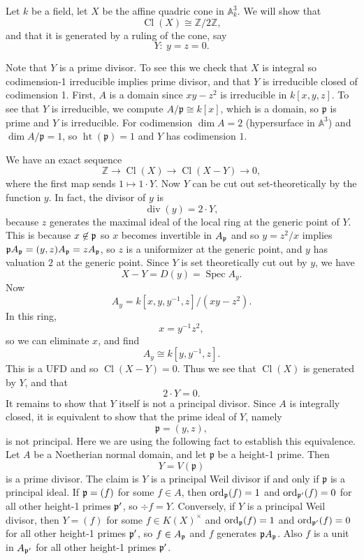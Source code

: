 \documentclass[12pt]{article}
\begin{document}
\begin{example}
    Let \(k\) be a field, let $X$ be the affine quadric cone in \(\mathbb A_k^3\). We will show that
    \[
        \operatorname{Cl}(X)\cong \mathbb Z/2\mathbb Z,
    \]
    and that it is generated by a ruling of the cone, say
    \[
        Y:\ y=z=0.
    \]

    Note that $Y$ is a prime divisor. To see this we check that $X$ is integral so codimension-1 irreducible implies prime divisor, and that $Y$ is irreducible closed of codimension 1. First, $A$ is a domain since $xy-z^2$ is irreducible in $k[x,y,z]$. To see that $Y$ is irreducible, we compute $A/\mathfrak{p} \cong k[x]$, which is a domain, so $\mathfrak{p}$ is prime and $Y$ is irreducible. For codimension $\dim A = 2$ (hypersurface in $\mathbb{A}^3$) and $\dim A/\mathfrak{p} = 1$, so $\operatorname{ht}(\mathfrak{p})=1$ and $Y$ has codimension $1$.

    We have an exact sequence
    \[
        \mathbb Z \longrightarrow \operatorname{Cl}(X)\longrightarrow \operatorname{Cl}(X-Y)\longrightarrow 0,
    \]
    where the first map sends \(1\mapsto 1\cdot Y\). Now \(Y\) can be cut out set-theoretically by the function \(y\). In fact, the divisor of \(y\) is
    \[
        \operatorname{div}(y)=2\cdot Y,
    \]
    because $z$ generates the maximal ideal of the local ring at the generic point of \(Y\). This is because $x\not\in \mathfrak{p}$ so $x$ becomes invertible in $A_{\mathfrak{p}}$ and so $y=z^2/x$ implies $\mathfrak{p} A_{\mathfrak{p}} = (y,z)A_{\mathfrak{p}} = z A_{\mathfrak{p}}$, so $z$ is a uniformizer at the generic point, and $y$ has valuation $2$ at the generic point. Since $Y$ is set theoretically cut out by $y$, we have
    \[
        X-Y= D(y)=\operatorname{Spec}A_y.
    \]
    Now
    \[
        A_y = k[x,y,y^{-1},z]/(xy-z^2).
    \]
    In this ring,
    \[
        x=y^{-1}z^2,
    \]
    so we can eliminate \(x\), and find
    \[
        A_y\cong k[y,y^{-1},z].
    \]
    This is a UFD and so $\operatorname{Cl}(X-Y)=0$. Thus we see that \(\operatorname{Cl}(X)\) is generated by \(Y\), and that
    \[
        2\cdot Y=0.
    \]
    It remains to show that \(Y\) itself is not a principal divisor. Since \(A\) is integrally closed, it is equivalent to show that the prime ideal of \(Y\), namely
    \[
        \mathfrak p=(y,z),
    \]
    is not principal. Here we are using the following fact to establish this equivalence. Let $A$ be a Noetherian normal domain, and let $\mathfrak{p}$ be a height-1 prime. Then
    \[
        Y=V(\mathfrak{p})
    \]
    is a prime divisor. The claim is $Y$ is a principal Weil divisor if and only if $\mathfrak{p}$ is a principal ideal. If $\mathfrak{p} = (f)$ for some $f \in A$, then $\operatorname{ord}_{\mathfrak{p}}(f) = 1$ and $\operatorname{ord}_{\mathfrak{p}'}(f) = 0$ for all other height-1 primes $\mathfrak{p}'$, so $\div f = Y$. Conversely, if $Y$ is a principal Weil divisor, then $Y=(f)$ for some $f\in K(X)^\times$ and $\operatorname{ord}_{\mathfrak{p}}(f)=1$ and $\operatorname{ord}_{\mathfrak{p}'}(f)=0$ for all other height-1 primes $\mathfrak{p}'$, so $f\in A_{\mathfrak{p}}$ and $f$ generates $\mathfrak{p} A_{\mathfrak{p}}$. Also $f$ is a unit in $A_{\mathfrak{p}'}$ for all other height-1 primes $\mathfrak{p}'$.


\end{example}
\end{document}
